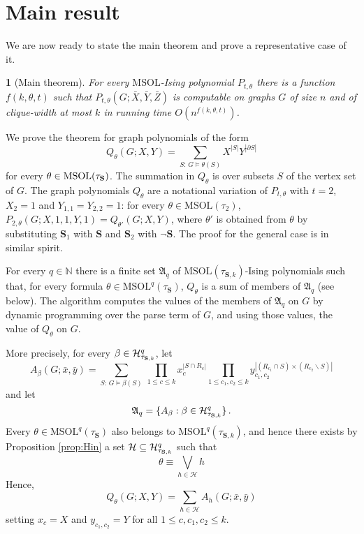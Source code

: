 \documentclass{llncs}
\newtheorem{thm}{\protect\theoremname}
\newcommand{\MSOL}{\mathrm{MSOL}}
\providecommand{\theoremname}{Theorem}
\begin{document}
\section{Main result}

We are now ready to state the main theorem and prove a representative
case of it. 
\begin{thm}
[Main theorem]\label{th:main} For every $\MSOL$-Ising polynomial
$P_{t,\theta}$ there is a function $f(k,\theta,t)$ such that $P_{t,\theta}(G;\bar{X},\bar{Y},\bar{Z})$
is computable on graphs $G$ of size $n$ and of clique-width at most
$k$ in running time $O(n^{f(k,\theta,t)})$. 
\end{thm}


We prove
the theorem for graph polynomials of the form 
\[
Q_{\theta}(G;X,Y)=\sum_{S:\, G\models\theta(S)}X^{|S|}Y^{|\partial S|}
\]
 for every $\theta\in\MSOL(\tau_{{\bf S}})$. The summation in $Q_{\theta}$
is over subsets $S$ of the vertex set of $G$. The graph polynomials
$Q_{\theta}$ are a notational variation of $P_{t,\theta}$ with $t=2$, $X_2=1$ and $Y_{1,1}=Y_{2,2}=1$: 
for every $\theta\in\MSOL(\tau_{2})$, $P_{2,\theta}(G;X,1,1,Y,1)=Q_{\theta'}(G;X,Y)$,
where $\theta'$ is obtained from $\theta$ by substituting $\mathbf{S}_{1}$
with $\mathbf{S}$ and $\mathbf{S}_{2}$ with $\neg\mathbf{S}$. The proof for the general case is 
in similar spirit. 

For every $q\in\mathbb{N}$ there is a finite set $\mathfrak{A}_{q}$ of $\MSOL(\tau_{\mathbf{S},k})$-Ising polynomials
 such that, for every formula $\theta\in \MSOL^q(\tau_{\mathbf{S}})$,
$Q_{\theta}$ is a sum of members of $\mathfrak{A}_{q}$ (see below).  
The algorithm computes the values of the members of $\mathfrak{A}_{q}$ on  $G$
by dynamic programming over the parse term of $G$, and using those values, the value of $Q_\theta$ on $G$.   

More precisely, for every $\beta\in\mathcal{H}_{\tau_{{\bf S},k}}^{q}$,
let 
\[
A_{\beta}(G;\bar{x},\bar{y})=\sum_{S:\, G\models\beta(S)}\,\prod_{1\leq c\le k}x_{c}^{|S\cap R_{c}|}\prod_{1\leq c_{1},c_{2}\leq k}y_{c_{1},c_{2}}^{|(R_{c_{1}}\cap S)\times(R_{c_{2}}\backslash S)|}
\]
and let 
$$\mathfrak{A}_q=\{A_{\beta}:\beta\in\mathcal{H}_{\tau_{{\bf S},k}}^{q}\}\,.$$
Every $\theta\in\MSOL^{q}(\tau_{\mathbf{S}})$ also belongs to $\MSOL^{q}(\tau_{\mathbf{S},k})$, and hence there
exists by Proposition \ref{prop:Hin} a set $\mathcal{H}\subseteq\mathcal{H}_{\tau_{{\bf S},k}}^{q}$
such that 
\[
\theta\equiv\bigvee_{h\in\mathcal{H}}h
\]
Hence,
\begin{equation}
Q_{\theta}(G;X,Y)=\sum_{h\in\mathcal{H}}A_{h}(G;\bar{x},\bar{y})\label{eq:sumQA}
\end{equation}
 setting $x_{c}=X$ and $y_{c_{1},c_{2}}=Y$ for all $1\leq c,c_{1},c_{2}\leq k$.
\end{document}
